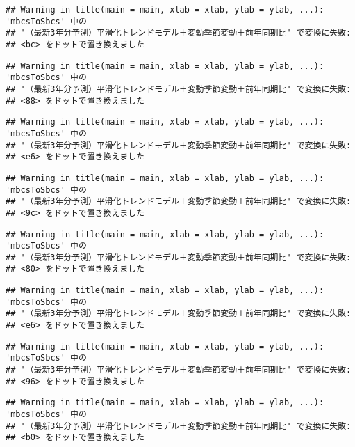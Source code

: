 \documentclass[]{article}
\begin{document}
\begin{verbatim}
## Warning in title(main = main, xlab = xlab, ylab = ylab, ...): 'mbcsToSbcs' 中の
## '（最新3年分予測）平滑化トレンドモデル＋変動季節変動＋前年同期比' で変換に失敗:
## <bc> をドットで置き換えました
\end{verbatim}

\begin{verbatim}
## Warning in title(main = main, xlab = xlab, ylab = ylab, ...): 'mbcsToSbcs' 中の
## '（最新3年分予測）平滑化トレンドモデル＋変動季節変動＋前年同期比' で変換に失敗:
## <88> をドットで置き換えました
\end{verbatim}

\begin{verbatim}
## Warning in title(main = main, xlab = xlab, ylab = ylab, ...): 'mbcsToSbcs' 中の
## '（最新3年分予測）平滑化トレンドモデル＋変動季節変動＋前年同期比' で変換に失敗:
## <e6> をドットで置き換えました
\end{verbatim}

\begin{verbatim}
## Warning in title(main = main, xlab = xlab, ylab = ylab, ...): 'mbcsToSbcs' 中の
## '（最新3年分予測）平滑化トレンドモデル＋変動季節変動＋前年同期比' で変換に失敗:
## <9c> をドットで置き換えました
\end{verbatim}

\begin{verbatim}
## Warning in title(main = main, xlab = xlab, ylab = ylab, ...): 'mbcsToSbcs' 中の
## '（最新3年分予測）平滑化トレンドモデル＋変動季節変動＋前年同期比' で変換に失敗:
## <80> をドットで置き換えました
\end{verbatim}

\begin{verbatim}
## Warning in title(main = main, xlab = xlab, ylab = ylab, ...): 'mbcsToSbcs' 中の
## '（最新3年分予測）平滑化トレンドモデル＋変動季節変動＋前年同期比' で変換に失敗:
## <e6> をドットで置き換えました
\end{verbatim}

\begin{verbatim}
## Warning in title(main = main, xlab = xlab, ylab = ylab, ...): 'mbcsToSbcs' 中の
## '（最新3年分予測）平滑化トレンドモデル＋変動季節変動＋前年同期比' で変換に失敗:
## <96> をドットで置き換えました
\end{verbatim}

\begin{verbatim}
## Warning in title(main = main, xlab = xlab, ylab = ylab, ...): 'mbcsToSbcs' 中の
## '（最新3年分予測）平滑化トレンドモデル＋変動季節変動＋前年同期比' で変換に失敗:
## <b0> をドットで置き換えました
\end{verbatim}
\end{document}
